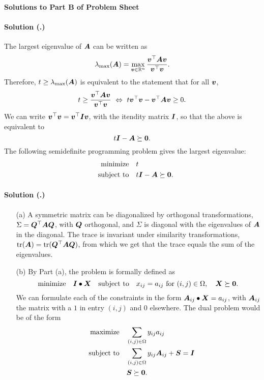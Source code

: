 \documentclass{article}
\newcounter{problemSheetNumber}
\newcounter{problems}
\renewcommand{\solution}[1]{\paragraph{Solution (\theproblemSheetNumber.\theproblems)}\addtocounter{problems}{1}\label{#1}}
\begin{document}
 
\begin{center}
{\Large {\bf Solutions to Part B of Problem Sheet \theproblemSheetNumber}}
\end{center}


\solution{pr:1} The largest eigenvalue of $\bm{A}$ can be written as
\begin{equation*}
 \lambda_{\mathrm{max}}(\bm{A}) = \max_{\bm{v}\in \mathbb{R}^n} \frac{\bm{v}^{\top}\bm{A}\bm{v}}{\bm{v}^{\top}\bm{v}}.
\end{equation*}
Therefore, $t\geq \lambda_{\mathrm{max}}(\bm{A})$ is equivalent to the statement that for all $\bm{v}$,
\begin{equation*}
 t\geq \frac{\vct{v}^{\trans}\mtx{A}\vct{v}}{\vct{v}^{\trans}\vct{v}} \ \Leftrightarrow \ t\vct{v}^{\trans}\vct{v}-\vct{v}^{\trans}\mtx{A}\vct{v}\geq 0.
\end{equation*}
We can write $\bm{v}^{\top}\bm{v}=\bm{v}^{\top}\bm{I}\bm{v}$, with the itendity matrix $\bm{I}$, so that the above is equivalent to
\begin{equation*}
 t\bm{I}-\bm{A}\succeq \bm{0}.
\end{equation*}
The following semidefinite programming problem gives the largest eigenvalue:
\begin{align*}
 \text{minimize}\quad & t\\
 \quad\text{subject to}\quad & t\bm{I}-\bm{A}\succeq \bm{0}.
\end{align*}

\solution{pr:2}
\begin{itemize}
\item[(a)] A symmetric matrix can be diagonalized by orthogonal transformations, $\Sigma = \bm{Q}^{\top}\bm{A}\bm{Q}$, with $\bm{Q}$ orthogonal, and $\Sigma$ is diagonal with the eigenvalues of $\bm{A}$ in the diagonal. The trace is invariant under similarity transformations, $\mathrm{tr}(\bm{A}) = \mathrm{tr}(\bm{Q}^{\top}\bm{A}\bm{Q})$, from which we get that the trace equals the sum of the eigenvalues.
\item[(b)] By Part (a), the problem is formally defined as
\begin{equation*}
  \text{minimize}\quad \bm{I}\bullet \bm{X} \quad\text{subject to}\quad x_{ij} = a_{ij} \text{ for } (i,j)\in \Omega, \quad \bm{X}\succeq \bm{0}.
\end{equation*}
We can formulate each of the constraints in the form $\bm{A}_{ij} \bullet \bm{X} = a_{ij}$, with $\bm{A}_{ij}$ the matrix with a $1$ in entry $(i,j)$ and $0$ elsewhere. The dual problem would be of the form
\begin{align*}
  \text{maximize}\quad &\sum_{(i,j)\in \Omega} y_{ij}a_{ij} \\
  \quad\text{subject to}\quad & \sum_{(i,j)\in \Omega} y_{ij}\bm{A}_{ij} +\bm{S} = \bm{I}\\
  & \bm{S}\succeq \bm{0}.
\end{align*}
\end{itemize}
\end{document}
